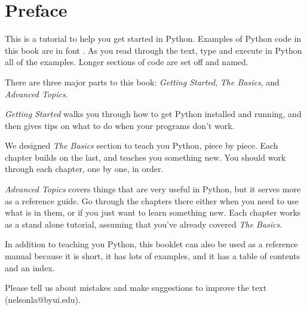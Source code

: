 \chapter*{Preface}

This is a tutorial to help you get started in Python. Examples of
Python code in this book are in font . As you read through the text, type and execute in Python all
of the examples. Longer sections of code
are set off and named.

There are three major parts to this book: {\em Getting Started}, {\em The Basics}, and {\em Advanced Topics}.

{\em Getting Started} walks you through how to get Python installed and running, and then gives tips on what to do when your programs don't work.

We designed {\em The Basics} section to teach you Python, piece by piece.  Each chapter builds on the last, and teaches you something new. You should work through each chapter, one by one, in order.

{\em Advanced Topics} covers things that are very useful in Python, but it serves more as a reference guide.  Go through the chapters there either when you need to use what is in them, or if you just want to learn something new.  Each chapter works as a stand alone tutorial, assuming that you've already covered {\em The Basics}.

In addition to teaching you Python, this booklet can also be used as a reference manual because it is
short, it has lots of examples, and it has a table of contents and
an index.

 Please tell us about mistakes and make suggestions to improve the text
(nelsonla@byui.edu).

